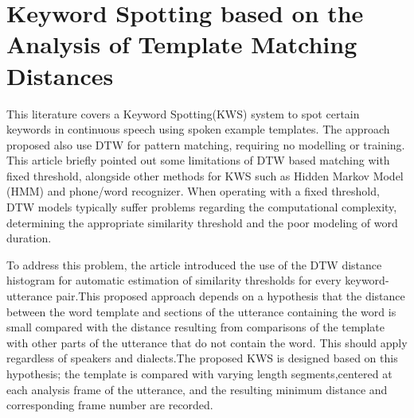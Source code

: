 \section{Keyword Spotting based on the Analysis of Template Matching Distances\cite{barakat}}
This literature covers a Keyword Spotting(KWS) system to spot certain keywords in continuous speech using spoken example templates. The approach proposed also use DTW for pattern matching, requiring no modelling or training. This article briefly pointed out some limitations of DTW based matching with fixed threshold, alongside other methods for KWS such as Hidden Markov Model (HMM) and phone/word recognizer. When operating with a fixed threshold, DTW models typically suffer problems regarding the computational complexity, determining the appropriate similarity threshold\cite{wilpon} and the poor modeling of word duration.\cite{yadong}

To address this problem, the article introduced the use of the DTW distance histogram for automatic estimation of similarity thresholds for every keyword-utterance pair.This proposed approach depends on a hypothesis that the distance between the word template and sections of the utterance containing the word is small compared with the distance resulting from comparisons of the template with other parts of the utterance that do not contain the word. This should apply regardless of speakers and dialects.The proposed KWS is designed based on this hypothesis; the template is compared with varying length segments,centered at each analysis frame of the utterance, and the resulting minimum distance and corresponding frame number are recorded. 

